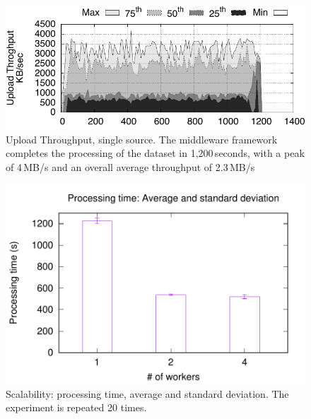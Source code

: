 \begin{figure}[t!]
  \centering
  \includegraphics[scale=0.7]{images/tput_upload_4-datas-1-worker.pdf}
  \caption{Upload Throughput, single source. The middleware framework completes the processing of the dataset in 1,200\,seconds, with a peak of 4\,MB/s and an overall average throughput of 2.3\,MB/s}
  \label{fig:throughput}
\end{figure}
\begin{figure}[t!]
  \centering
  \includegraphics[scale=0.5]{images/avg_stdev_4_streams}
  \caption{Scalability: processing time, average and standard deviation. The experiment is repeated 20 times.}
  \label{fig:scalability}
\end{figure}
